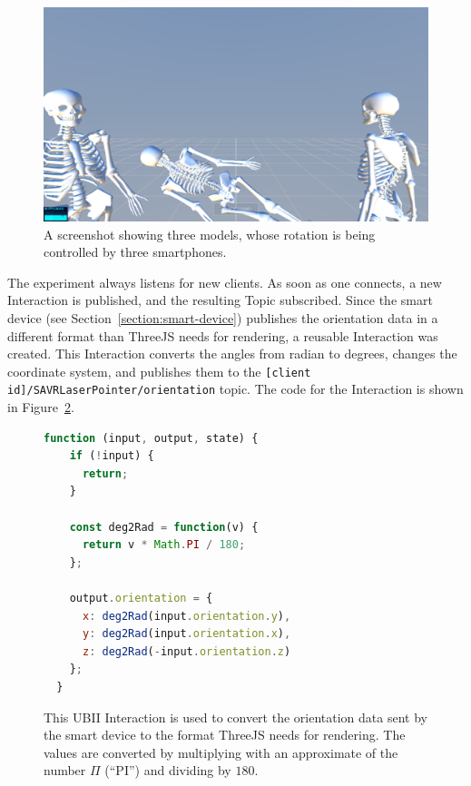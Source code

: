 \begin{figure}[H]
	\centering
	\includegraphics[width=12cm]{figures/implementation/screenshot_exp_mv.png}
	\caption[Screenshot of the model viewer]{A screenshot showing three models, whose rotation is being controlled by three smartphones.}\label{fig:screenshot-exp-mv}
\end{figure}

The experiment always listens for new clients. As soon as one connects, a new Interaction is published, and the resulting Topic subscribed. Since the smart device (see Section~\ref{section:smart-device}) publishes the orientation data in a different format than ThreeJS needs for rendering, a reusable Interaction was created. This Interaction converts the angles from radian to degrees, changes the coordinate system, and publishes them to the \lstinline[breaklines=false]{[client id]/SAVRLaserPointer/orientation} topic. The code for the Interaction is shown in Figure~\ref{fig:ubii-interaction-angles}.

\begin{figure}[H]
	\begin{lstlisting}[language=JavaScript]
  function (input, output, state) {
    if (!input) {
      return;
    }

    const deg2Rad = function(v) {
      return v * Math.PI / 180;
    };

    output.orientation = {
      x: deg2Rad(input.orientation.y),
      y: deg2Rad(input.orientation.x),
      z: deg2Rad(-input.orientation.z)
    };
  }
 \end{lstlisting}
	\caption[A UBII Interaction of model viewer]{This \ac{UBII} Interaction is used to convert the orientation data sent by the smart device to the format ThreeJS needs for rendering. The values are converted by multiplying with an approximate of the number $\Pi$ (\enquote{PI}) and dividing by $180$.}\label{fig:ubii-interaction-angles} %
\end{figure}

